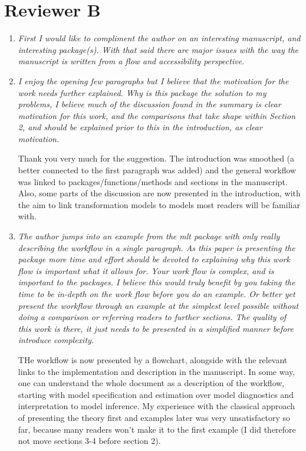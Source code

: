 \documentclass[12pt]{article}
\begin{document}
\section*{Reviewer B}

\begin{enumerate}

\item \textit{First I would like to compliment the author on an interesting
manuscript, and interesting package(s).  With that said there are major
issues with the way the manuscript is written from a flow and accessibility
perspective.  }


\item \textit{I enjoy the opening few paragraphs but I believe that the
motivation for the work needs further explained.  Why is this package the
solution to my problems, I believe much of the discussion found in the
summary is clear motivation for this work, and the comparisons that take
shape within Section 2, and should be explained prior to this in the
introduction, as clear motivation.  }

Thank you very much for the suggestion. The introduction was smoothed (a
better connected to the first paragraph was added) and the general workflow
was linked to packages/functions/methods and sections in the manuscript.
Also, some parts of the discussion are now presented in the introduction,
with the aim to link transformation models to models most readers will be
familiar with.

\item \textit{The author jumps into an example from the mlt package with
only really describing the workflow in a single paragraph.  As this paper is
presenting the package more time and effort should be devoted to explaining
why this work flow is important what it allows for.  Your work flow is
complex,  and  is important to the packages.  I believe this would truly
benefit by you taking the time to be in-depth on the work flow before you do
an example.  Or better yet present the workflow through an example at the
simplest level possible without doing a comparison or referring readers to
further sections.  The quality of this work is there, it just needs to be
presented in a simplified manner before introduce complexity.  }

THe workflow is now presented by a flowchart, alongside with the relevant
links to the implementation and description in the manuscript. In some way,
one can understand the whole document as a description of the workflow,
starting with model specification and estimation over model diagnostics and
interpretation to model inference. My experience with the classical approach 
of presenting the theory first and examples later was very unsatisfactory so
far, because many readers won't make it to the first example (I did
therefore not move sections 3-4 before section 2).


\end{enumerate}
\end{document}
